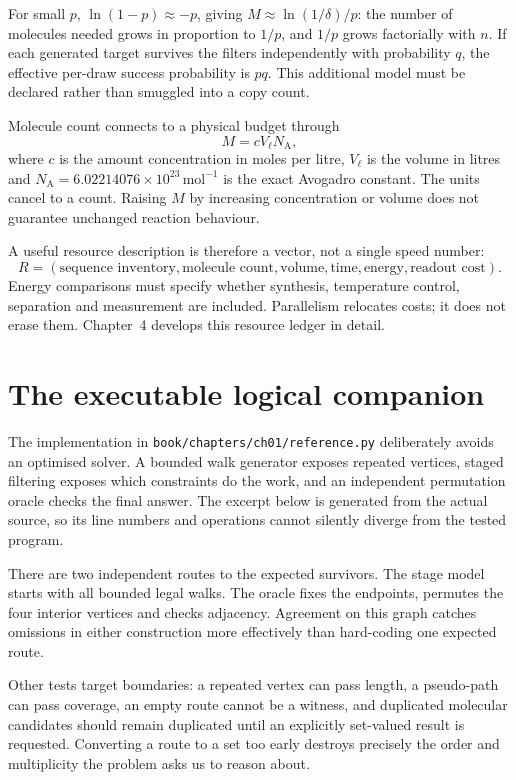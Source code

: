 For small $p$, $\ln(1-p)\approx-p$, giving $M\approx\ln(1/\delta)/p$: the number of
molecules needed grows in proportion to $1/p$, and $1/p$ grows factorially with
$n$. If each generated target survives the filters independently with
probability $q$, the effective per-draw success probability is $pq$. This
additional model must be declared rather than smuggled into a copy count.

Molecule count connects to a physical budget through
\[
 M=cV_{\ell}N_{\mathrm A},
\]
where $c$ is the amount concentration in moles per litre, $V_{\ell}$ is the volume
in litres and $N_{\mathrm A}=6.02214076\times10^{23}\,\mathrm{mol}^{-1}$ is the
exact Avogadro constant.\cite{BIPMmole} The units cancel to a count. Raising $M$
by increasing concentration or volume does not guarantee unchanged reaction
behaviour.

A useful resource description is therefore a vector, not a single speed number:
\[
 R=(\text{sequence inventory},\text{molecule count},\text{volume},
       \text{time},\text{energy},\text{readout cost}).
\]
Energy comparisons must specify whether synthesis, temperature control,
separation and measurement are included. Parallelism relocates costs; it does not
erase them. Chapter~4 develops this resource ledger in detail.

\section{The executable logical companion}\label{sec:code}
The implementation in \texttt{book/chapters/ch01/reference.py} deliberately avoids
an optimised solver. A bounded walk generator exposes repeated vertices, staged
filtering exposes which constraints do the work, and an independent permutation
oracle checks the final answer. The excerpt below is generated from the actual
source, so its line numbers and operations cannot silently diverge from the tested
program.


There are two independent routes to the expected survivors. The stage model
starts with all bounded legal walks. The oracle fixes the endpoints, permutes the
four interior vertices and checks adjacency. Agreement on this graph catches
omissions in either construction more effectively than hard-coding one expected
route.

Other tests target boundaries: a repeated vertex can pass length, a pseudo-path
can pass coverage, an empty route cannot be a witness, and duplicated molecular
candidates should remain duplicated until an explicitly set-valued result is
requested. Converting a route to a set too early destroys precisely the order and
multiplicity the problem asks us to reason about.

